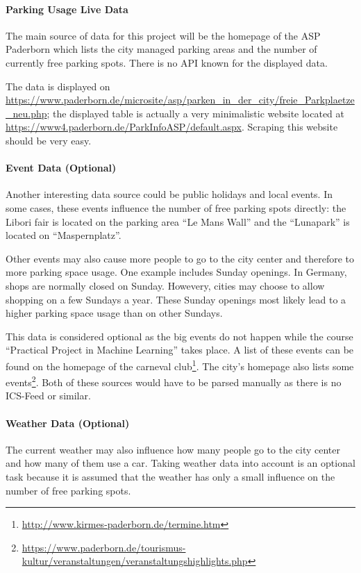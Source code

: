 \documentclass[journal,10pt]{IEEEtran}
\begin{document}
\paragraph{Parking Usage Live Data}
The main source of data for this project will be the homepage of the ASP Paderborn which lists the city managed parking areas and the number of currently free parking spots. There is no API known for the displayed data. 

The data is displayed on \url{https://www.paderborn.de/microsite/asp/parken_in_der_city/freie_Parkplaetze_neu.php}; the displayed table is actually a very minimalistic website located at \url{https://www4.paderborn.de/ParkInfoASP/default.aspx}. Scraping this website should be very easy.

\paragraph{Event Data (Optional)}
Another interesting data source could be public holidays and local events. In some cases, these events influence the number of free parking spots directly: the Libori fair is located on the parking area ``Le Mans Wall'' and the ``Lunapark'' is located on ``Maspernplatz''. 

Other events may also cause more people to go to the city center and therefore to more parking space usage. One example includes Sunday openings. In Germany, shops are normally closed on Sunday. Howevery, cities may choose to allow shopping on a few Sundays a year. These Sunday openings most likely lead to a higher parking space usage than on other Sundays.

This data is considered optional as the big events do not happen while the course ``Practical Project in Machine Learning'' takes place. A list of these events can be found on the homepage of the carneval club\footnote{\url{http://www.kirmes-paderborn.de/termine.htm}}. The city's homepage also lists some events\footnote{\url{https://www.paderborn.de/tourismus-kultur/veranstaltungen/veranstaltungshighlights.php}}. Both of these sources would have to be parsed manually as there is no ICS-Feed or similar. 

\paragraph{Weather Data (Optional)}

The current weather may also influence how many people go to the city center and how many of them use a car. Taking weather data into account is an optional task because it is assumed that the weather has only a small influence on the number of free parking spots.
\end{document}
